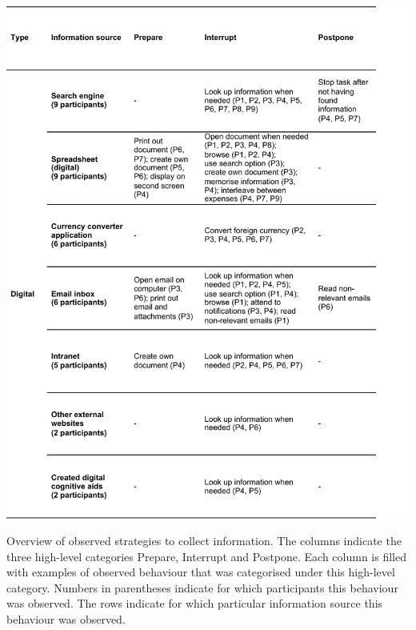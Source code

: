 \begin{table}
\centering
\includegraphics[scale=0.8]{images/ch12/ch12_TableDig.pdf}
\caption[Study 2 overview of observed inquiry strategies]{Overview of observed strategies to collect information. The columns indicate the three high-level categories Prepare, Interrupt and Postpone. Each column is filled with examples of observed behaviour that was categorised under this high-level category. Numbers in parentheses indicate for which participants this behaviour was observed. The rows indicate for which particular information source this behaviour was observed.}
\label{tbl:ch12_Table2}
\end{table}

